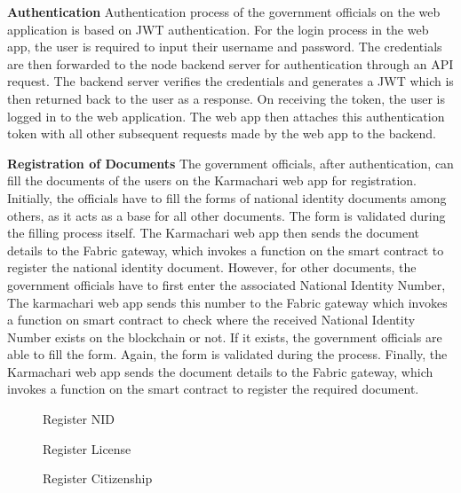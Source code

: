 \textbf{Authentication}\newline
    Authentication process of the government officials on the web application is based on JWT authentication. For the login process in the web app, the user is required to input their username and password. The credentials are then forwarded to the node backend server for authentication through an API request. The backend server verifies the credentials and generates a JWT which is then returned back to the user as a response. On receiving the token, the user is logged in to the web application. The web app then attaches this authentication token with all other subsequent requests made by the web app to the backend.

\textbf{Registration of Documents} \newline
The government officials, after authentication, can fill the documents of the users on the Karmachari web app for registration. Initially, the officials have to fill the forms of national identity documents among others, as it acts as a base for all other documents. The form is validated during the filling process itself. The Karmachari web app then sends the document details to the Fabric gateway, which invokes a function on the smart contract to register the national identity document. However, for other documents, the government officials have to first enter the associated National Identity Number, The karmachari web app sends this number to the Fabric gateway which invokes a function on smart contract to check where the received National Identity Number exists on the blockchain or not. If it exists, the government officials are able to fill the form. Again, the form is validated during the process. Finally, the Karmachari web app sends the document details to the Fabric gateway, which invokes a function on the smart contract to register the required document.
    \begin{figure}[H]
\centerline{}
\caption{Register NID}

\label{fig: example}
\end{figure}
   \begin{figure}[H]
\centerline{}
\caption{Register License}

\label{fig: RegisterLicense.svg}
\end{figure}

   \begin{figure}[H]
\centerline{}
\caption{Register Citizenship}

\label{fig: example}
\end{figure}

